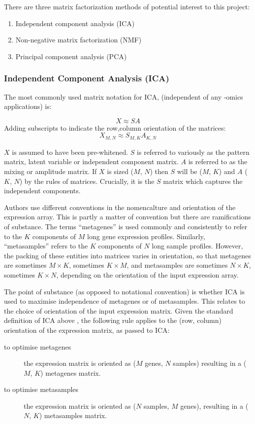\documentclass[tikz, 12pt,a4paper,oneside,fleqn]{article}
\begin{document}
There are three matrix factorization methods of potential interest to this project:
\begin{enumerate}
\item Independent component analysis (ICA)
\item Non-negative matrix factorization (NMF)
\item Principal component analysis (PCA)
\end{enumerate}


\subsubsection{Independent Component Analysis (ICA)}

The most commonly used matrix notation for ICA, (independent of any -omics applications) is:

\begin{equation}
X \approx S A
\end{equation}
Adding subscripts to indicate the row,column orientation of the matrices:
\begin{equation}
X_{M,N} \approx S_{M,K} A_{K,N}
\end{equation}

$X$ is assumed to have been pre-whitened.  $S$ is referred to variously as the pattern matrix, latent variable or independent component matrix.  $A$ is referred to as the mixing or amplitude matrix.   If $X$ is sized ($M$, $N$) then $S$ will be ($M$, $K$) and $A$ ($K$, $N$) by the rules of matrices.  Crucially, it is the $S$ matrix which captures the independent components.

Authors use different conventions in the nomencalture and orientation of the expression array.  This is partly a matter of convention but there are ramifications of substance.   The terms ``metagenes'' is used commonly and consistently to refer to the $K$ components of $M$ long gene expression profiles.  Similarly, ``metasamples'' refers to the $K$ components of $N$ long sample profiles.   However, the packing of these entities into matrices varies in orientation, so that metagenes are sometimes $M \times K$, sometimes $K \times M$, and metasamples are sometimes $N \times K$, sometimes $K \times N$, depending on the orientation of the input expression array.

The point of substance (as opposed to notational convention) is whether ICA is used to maximise independence of metagenes or of metasamples.  This relates to the choice of orientation of the input expression matrix.  Given the standard definition of ICA above \cite{ICA_definition}, the following rule applies to the (row, column) orientation of the expression matrix, as passed to ICA:
\begin{description}
\item[to optimise metagenes] the expression matrix is oriented as ($M$ genes, $N$ samples) resulting in a ($M$, $K$) metagenes matrix. 
\item[to optimise metasamples] the expression matrix is oriented as ($N$ samples, $M$ genes), resulting in a ($N$, $K$) metasamples matrix.
\end{description}
\end{document}
